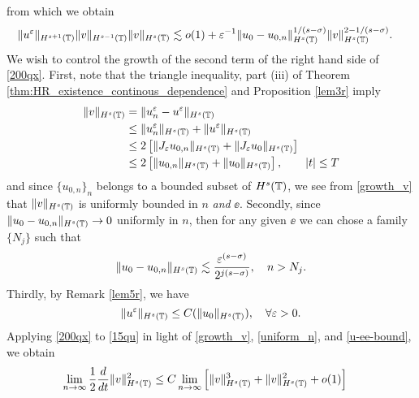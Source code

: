 from which we obtain
\begin{equation}
	\begin{split}
		\label{200qx}
		\|u^\varepsilon\|_{H^{s+1}(\mathbb{T})} \|v\|_{H^{s-1}(\mathbb{T})} \|v \|_{H^s(\mathbb{T})}
		& \lesssim  o(1) + \varepsilon^{-1}
		\|u_0-u_{0,n}\|_{H^s(\mathbb{T})}^{1/(s-\sigma)}\|v\|_{H^s(\mathbb{T})}^{2- 1/(s-\sigma)}.
	\end{split}
\end{equation}
We wish to control the growth of the second term of the
right hand side of \eqref{200qx}.
First, note that the triangle inequality, part (iii) of Theorem
\ref{thm:HR_existence_continous_dependence} and Proposition \ref{lem3r} imply
\begin{equation}
	\begin{split}
		\|v\|_{H^s(\mathbb{T})} & = \|u^\varepsilon_n - u^\varepsilon \|_{H^s(\mathbb{T})} 
		\\
		& \le \|u^\varepsilon_n\|_{H^s(\mathbb{T})} + \|u^\varepsilon \|_{H^s(\mathbb{T})}  
		\\
		& \le 2\left[  \|J_\varepsilon u_{0,n}\|_{H^s(\mathbb{T})} + \|J_\varepsilon u_0 \|_{H^s(\mathbb{T})} 
		 \right]
		\\
		& \le 2 \left[ \|u_{0,n} \|_{H^s(\mathbb{T})} + \|u_0 \|_{H^s(\mathbb{T})} 
		\right], \qquad |t| \le T
		\label{growth_v}
	\end{split}
\end{equation}
and since $\{u_{0,n}\}_n$ belongs to a bounded subset of
$H^s(\mathbb{T})$, we see from \eqref{growth_v} that $\|v \|_{H^s(\mathbb{T})}$ is
uniformly bounded in $n$ \emph{and} $\ee$.  Secondly, since $\|u_0 -
u_{0,n} \|_{H^s(\mathbb{T})} \to 0$ uniformly in $n$, then for any given $\ee$ we
can chose a family $\{N_j\} $ such that
\begin{equation}
	\begin{split}
		\|u_0 - u_{0,n} \|_{H^s(\mathbb{T})} \lesssim
		\frac{\varepsilon^{(s-\sigma)}}{2^{j(s -\sigma)}}, \quad n >
		N_j.
		\label{uniform_n}
	\end{split}
\end{equation}
Thirdly, by Remark \ref{lem5r}, we have 
\begin{equation}
	\label{u-ee-bound}
	\|u^\varepsilon \|_{H^s(\mathbb{T})} \le C(\|u_0\|_{H^s(\mathbb{T})}), \quad \forall \varepsilon > 0.
\end{equation}
Applying \eqref{200qx} to \eqref{15qu} in light of 
\eqref{growth_v}, \eqref{uniform_n}, and \eqref{u-ee-bound}, we obtain
\begin{equation*}
		\begin{split}
			\lim_{n \to \infty }
			\frac{1}{2}\frac{d}{dt}\|v\|_{H^{s}(\mathbb{T})}^2
			& \le
			C \lim_{n \to \infty} \Big [\|v\|_{H^s(\mathbb{T})}^3 +
			\|v\|_{H^s(\mathbb{T})}^2 + o(1)\Big ]
		\end{split}
	\end{equation*}
